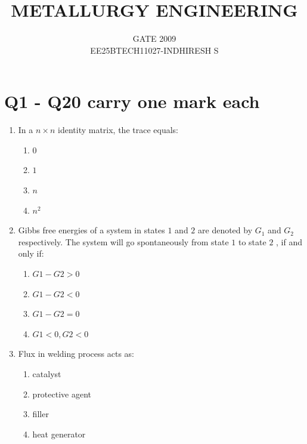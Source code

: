 \documentclass[journal]{IEEEtran}
\theoremstyle{remark}
\begin{document}

\onecolumn

\title{METALLURGY ENGINEERING}
\author{GATE 2009\\
EE25BTECH11027-INDHIRESH S}
\maketitle


\renewcommand{\thefigure}{\theenumi}
\renewcommand{\thetable}{\theenumi}

\section{Q1 - Q20 carry one mark each}
\begin{enumerate}
\item  In a $n\times n $ identity matrix, the trace equals: \hfill{}

\begin{multicols}{4}
\begin{enumerate}
\item $0$
\item $1$
\item $n$
\item $n^2$
\end{enumerate}
\end{multicols}

\item  Gibbs free energies of a system in states $1$ and $2$ are denoted by $G_1$ and $G_2$ respectively. The system will go spontaneously from state $1$ to state $2$ , if and only if: \hfill{}
\begin{multicols}{4}
\begin{enumerate}
\item $G1-G2>0$
\item $G1-G2<0$
\item $G1-G2=0$
\item $G1<0 , G2<0$
\end{enumerate}
\end{multicols}

\item Flux in welding process acts as:
\hfill{}
\begin{multicols}{2}
\begin{enumerate}
\item catalyst
\item protective agent
\item filler
\item heat generator
\end{enumerate}
\end{multicols}


\end{enumerate}
\end{document}
